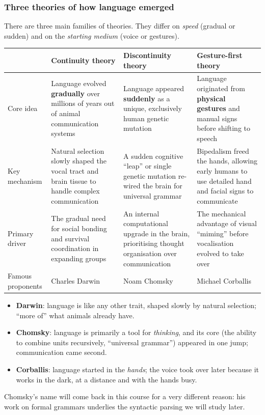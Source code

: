 \subsubsection{Three theories of how language emerged}

There are three main families of theories. They differ on \emph{speed} (gradual or
sudden) and on the \emph{starting medium} (voice or gestures).

\begin{center}
\small
\begin{tabularx}{\linewidth}{@{}>{\raggedright\arraybackslash}p{1.9cm} *{3}{>{\raggedright\arraybackslash}X}@{}}
\toprule
 & \textbf{Continuity theory} & \textbf{Discontinuity theory} & \textbf{Gesture-first theory} \\
\midrule
Core idea & Language evolved \textbf{gradually} over millions of years out of animal
  communication systems &
  Language appeared \textbf{suddenly} as a unique, exclusively human genetic mutation &
  Language originated from \textbf{physical gestures} and manual signs before shifting
  to speech \\[2pt]
Key mechanism & Natural selection slowly shaped the vocal tract and brain tissue to
  handle complex communication &
  A sudden cognitive ``leap'' or single genetic mutation re-wired the brain for
  universal grammar &
  Bipedalism freed the hands, allowing early humans to use detailed hand and facial
  signs to communicate \\[2pt]
Primary driver & The gradual need for social bonding and survival coordination in
  expanding groups &
  An internal computational upgrade in the brain, prioritising thought organisation over
  communication &
  The mechanical advantage of visual ``miming'' before vocalisation evolved to take
  over \\[2pt]
Famous proponents & Charles Darwin & Noam Chomsky & Michael Corballis \\
\bottomrule
\end{tabularx}
\label{tab:theories}
\end{center}

\begin{nbintuition}
\begin{itemize}[nosep]
  \item \textbf{Darwin}: language is like any other trait, shaped slowly by natural
        selection; ``more of'' what animals already have.
  \item \textbf{Chomsky}: language is primarily a tool for \emph{thinking}, and its core
        (the ability to combine units recursively, ``universal grammar'') appeared in one
        jump; communication came second.
  \item \textbf{Corballis}: language started in the \emph{hands}; the voice took over
        later because it works in the dark, at a distance and with the hands busy.
\end{itemize}
Chomsky's name will come back in this course for a very different reason: his work on
formal grammars underlies the syntactic parsing we will study later.
\end{nbintuition}
